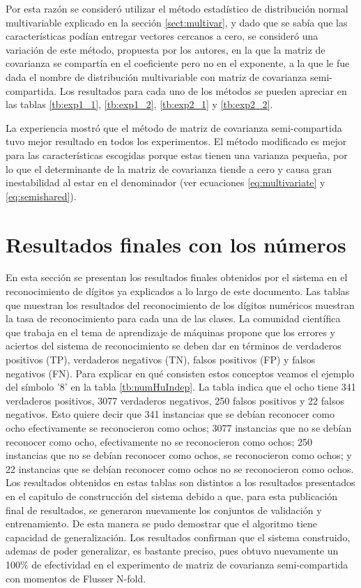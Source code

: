 \documentclass[a4paper, 11pt, oneside]{report}
\begin{document}
Por esta razón se consideró utilizar el método estadístico de distribución normal multivariable explicado en la sección \ref{sect:multivar}, y dado que se sabía que las características podían entregar vectores cercanos a cero, se consideró una variación de este método, propuesta por los autores, en la que la matriz de covarianza se compartía en el coeficiente pero no en el exponente, a la que le fue dada el nombre de distribución multivariable con matriz de covarianza semi-compartida. Los resultados para cada uno de los métodos se pueden apreciar en las tablas \ref{tb:exp1_1}, \ref{tb:exp1_2}, \ref{tb:exp2_1} y \ref{tb:exp2_2}.

La experiencia mostró que el método de matriz de covarianza semi-compartida tuvo mejor resultado en todos los experimentos. El método modificado es mejor para las características escogidas porque estas tienen una varianza pequeña, por lo que el determinante de la matriz de covarianza tiende a cero y causa gran inestabilidad al estar en el denominador (ver ecuaciones \ref{eq:multivariate} y \ref{eq:semishared}).

\section{Resultados finales con los números}

En esta sección se presentan los resultados finales obtenidos por el sistema en el reconocimiento de dígitos ya explicados a lo largo de este documento. Las tablas que muestran los resultados del reconocimiento de los dígitos numéricos muestran la tasa de reconocimiento para cada una de las clases. La comunidad científica que trabaja en el tema de aprendizaje de máquinas propone que los errores y aciertos del sistema de reconocimiento se deben dar en términos de verdaderos positivos (TP), verdaderos negativos (TN), falsos positivos (FP) y falsos negativos (FN). Para explicar en qué consisten estos conceptos veamos el ejemplo del símbolo '8' en la tabla \ref{tb:numHuIndep}. La tabla indica que el ocho tiene 341 verdaderos positivos, 3077 verdaderos negativos, 250 falsos positivos y 22 falsos negativos. Esto quiere decir que 341 instancias que se debían reconocer como ocho efectivamente se reconocieron como ochos; 3077 instancias que no se debían reconocer como ocho, efectivamente no se reconocieron como ochos; 250 instancias que no se debían reconocer como ochos, se reconocieron como ochos; y 22 instancias que se debían reconocer como ochos no se reconocieron como ochos. Los resultados obtenidos en estas tablas son distintos a los resultados presentados en el capitulo de construcción del sistema debido a que, para esta publicación final de resultados, se generaron nuevamente los conjuntos de validación y entrenamiento. De esta manera se pudo demostrar que el algoritmo tiene capacidad de generalización. Los resultados confirman que el sistema construido, ademas de poder generalizar, es bastante preciso, pues obtuvo nuevamente un 100\% de efectividad en el  experimento de matriz de covarianza semi-compartida con momentos de Flusser N-fold.
\end{document}

